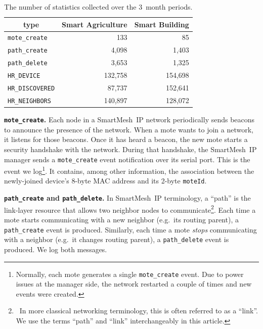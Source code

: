 \documentclass{elsarticle}
\newcommand{\smip}                {SmartMesh~IP\xspace}
\newcommand{\building}            {Smart Building\xspace}
\newcommand{\agri}                {Smart Agriculture\xspace}
\newcommand{\HRNEIGHBORS}         {{\tt HR\_NEIGHBORS}\xspace}
\newcommand{\HRDISCOVERED}        {{\tt HR\_DISCOVERED}\xspace}
\newcommand{\HRDEVICE}            {{\tt HR\_DEVICE}\xspace}
\newcommand{\pathcreate}          {{\tt path\_create}\xspace}
\newcommand{\pathdelete}          {{\tt path\_delete}\xspace}
\newcommand{\motecreate}          {{\tt mote\_create}\xspace}
\newcommand{\moteId}              {{\tt moteId}\xspace}
\newcommand{\PEACHNUMHRNEIGHBORS} {140,897\xspace}
\newcommand{\EVANUMHRNEIGHBORS}   {128,072\xspace}
\begin{document}
\begin{table}
    \centering
    \begin{tabular}{|l|r|r|}
        \toprule
        \multicolumn{1}{|c|}{type} & \multicolumn{1}{|c|}{\agri} & \multicolumn{1}{|c|}{\building} \\ \hline
        \hline
        \motecreate                &                         133 &                              85 \\ \hline
        \pathcreate                &                       4,098 &                           1,403 \\ \hline
        \pathdelete                &                       3,653 &                           1,325 \\ \hline
        \HRDEVICE                  &                     132,758 &                         154,698 \\ \hline
        \HRDISCOVERED              &                      87,737 &                         152,641 \\ \hline
        \HRNEIGHBORS               &        \PEACHNUMHRNEIGHBORS &              \EVANUMHRNEIGHBORS \\ \hline
    \end{tabular}
    \caption{The number of statistics collected over the 3~month periods.}
    \label{tab:msg_stats}
\end{table}

\textbf{\motecreate.}
Each node in a \smip network periodically sends beacons to announce the presence of the network.
When a mote wants to join a network, it listens for those beacons.
Once it has heard a beacon, the new mote starts a security handshake with the network.
During that handshake, the \smip manager sends a \motecreate event notification over its serial port.
This is the event we log\footnote{Normally, each mote generates a single \motecreate event. Due to power issues at the manager side, the network restarted a couple of times and new events were created.}.
It contains, among other information, the association between the newly-joined device's 8-byte MAC address and its 2-byte \moteId.

\textbf{\pathcreate and \pathdelete.}
In \smip terminology, a ``path'' is the link-layer resource that allows two neighbor nodes to communicate\footnote{~In more classical networking terminology, this is often referred to as a ``link''. We use the terms ``path'' and ``link'' interchangeably in this article.}.
Each time a mote starts communicating with a new neighbor (e.g.~its routing parent), a \pathcreate event is produced.
Similarly, each time a mote \textit{stops} communicating with a neighbor (e.g.~it changes routing parent), a \pathdelete event is produced.
We log both messages.
\end{document}
